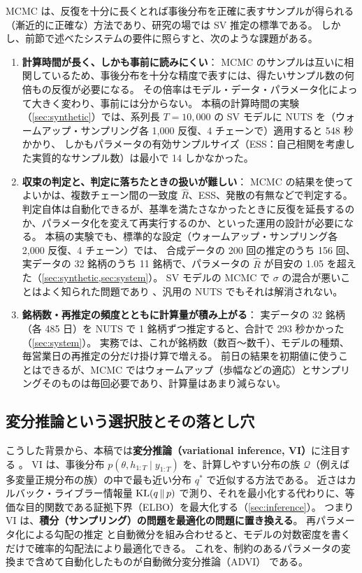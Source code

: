 MCMC は、反復を十分に長くとれば事後分布を正確に表すサンプルが得られる（漸近的に正確な）方法であり、研究の場では SV 推定の標準である。
しかし、前節で述べたシステムの要件に照らすと、次のような課題がある。

\begin{enumerate}[label=(\arabic*)]
  \item \textbf{計算時間が長く、しかも事前に読みにくい}：
    MCMC のサンプルは互いに相関しているため、事後分布を十分な精度で表すには、得たいサンプル数の何倍もの反復が必要になる。
    その倍率はモデル・データ・パラメータ化によって大きく変わり、事前には分からない。
    本稿の計算時間の実験（\cref{sec:synthetic}）では、系列長 $T=10{,}000$ の SV モデルに NUTS を（ウォームアップ・サンプリング各 1,000 反復、4 チェーンで）適用すると 548 秒かかり、
    しかもパラメータの有効サンプルサイズ（ESS：自己相関を考慮した実質的なサンプル数）は最小で 14 しかなかった。
  \item \textbf{収束の判定と、判定に落ちたときの扱いが難しい}：
    MCMC の結果を使ってよいかは、複数チェーン間の一致度 $\hat R$、ESS、発散の有無などで判定する。
    判定自体は自動化できるが、基準を満たさなかったときに反復を延長するのか、パラメータ化を変えて再実行するのか、といった運用の設計が必要になる。
    本稿の実験でも、標準的な設定（ウォームアップ・サンプリング各 2,000 反復、4 チェーン）では、
    合成データの 200 回の推定のうち 156 回、実データの 32 銘柄のうち 11 銘柄で、パラメータの $\hat R$ が目安の 1.05 を超えた（\cref{sec:synthetic,sec:system}）。
    SV モデルの MCMC で $\sigma$ の混合が悪いことはよく知られた問題であり \parencite{kastner2014}、汎用の NUTS でもそれは解消されない。
  \item \textbf{銘柄数・再推定の頻度とともに計算量が積み上がる}：
    実データの 32 銘柄（各 485 日）を NUTS で 1 銘柄ずつ推定すると、合計で 293 秒かかった（\cref{sec:system}）。
    実務では、これが銘柄数（数百〜数千）、モデルの種類、毎営業日の再推定の分だけ掛け算で増える。
    前日の結果を初期値に使うことはできるが、MCMC ではウォームアップ（歩幅などの適応）とサンプリングそのものは毎回必要であり、計算量はあまり減らない。
\end{enumerate}

\subsection{変分推論という選択肢とその落とし穴}\label{sec:intro-vi}

こうした背景から、本稿では\textbf{変分推論（variational inference, VI）}に注目する \parencite{blei2017}。
VI は、事後分布 $p(\theta, h_{1:T} \mid y_{1:T})$ を、計算しやすい分布の族 $\mathcal{Q}$（例えば多変量正規分布の族）の中で最も近い分布 $q^\ast$ で近似する方法である。
近さはカルバック・ライブラー情報量 $\mathrm{KL}(q \,\|\, p)$ で測り、それを最小化する代わりに、等価な目的関数である証拠下界（ELBO）を最大化する（\cref{sec:inference}）。
つまり VI は、\textbf{積分（サンプリング）の問題を最適化の問題に置き換える}。
再パラメータ化による勾配の推定 \parencite{kingma2014} と自動微分を組み合わせると、モデルの対数密度を書くだけで確率的勾配法により最適化できる。
これを、制約のあるパラメータの変換まで含めて自動化したものが自動微分変分推論（ADVI）\parencite{kucukelbir2017} である。

